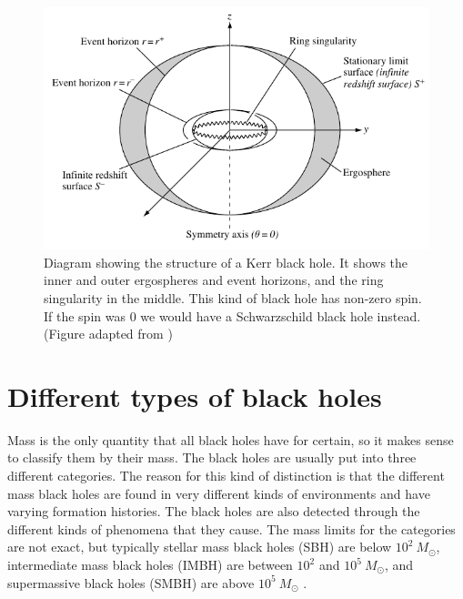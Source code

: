\documentclass[english, oneside]{HYgradu}
\begin{document}
\begin{figure}[h!tb]
\centering
\includegraphics[width=\textwidth]{../images/kerrhole.pdf}
\caption{Diagram showing the structure of a Kerr black hole. It shows the inner and outer ergospheres and event horizons, and the ring singularity in the middle. This kind of black hole has non-zero spin. If the spin was 0 we would have a Schwarzschild black hole instead.
(Figure adapted from \citealt{grintro})}
\label{fig:KerrHole}
\end{figure}




\newpage
\section{Different types of black holes}

Mass is the only quantity that all black holes have for certain, so it makes sense to classify them by their mass. The black holes are usually put into three different categories. The reason for this kind of distinction is that the different mass black holes are found in very different kinds of environments and have varying formation histories. The black holes are also detected through the different kinds of phenomena that they cause. %
The mass limits for the categories are not exact, but typically stellar mass black holes (SBH) are below $10^2 \ M_\odot$, intermediate mass black holes (IMBH) are between $10^2$ and $10^5 \ M_\odot$, and supermassive black holes (SMBH) are above $10^5 \ M_\odot$ \citep{bhphysics}.
\end{document}
